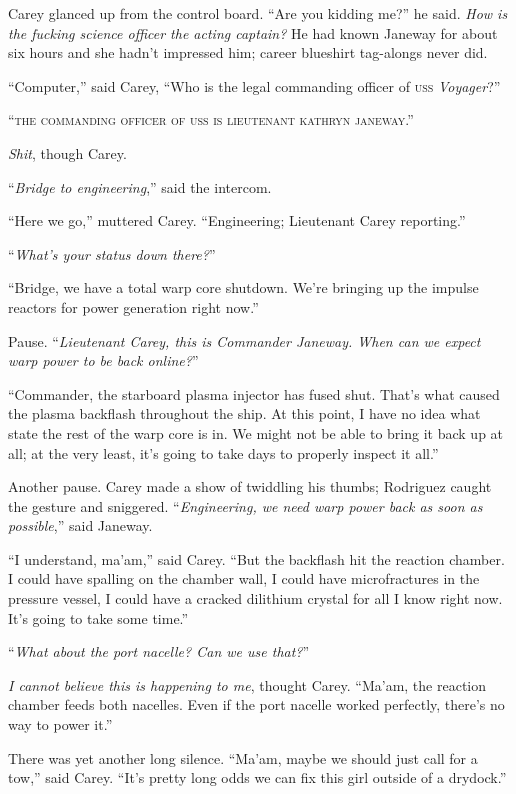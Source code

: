 \documentclass[twoside,letterpaper,12pt]{memoir}
\begin{document}
Carey glanced up from the control board. ``Are you kidding me?'' he said. \textit{How is the fucking science officer the acting captain?} He had known Janeway for about six hours and she hadn't impressed him; career blueshirt tag-alongs never did.

``Computer,'' said Carey, ``Who is the legal commanding officer of \textsc{uss} \textit{Voyager}?''

``\textsc{the commanding officer of uss}  \textsc{is lieutenant kathryn janeway}.''

\textit{Shit}, though Carey.

``\textit{Bridge to engineering},'' said the intercom.

``Here we go,'' muttered Carey. ``Engineering; Lieutenant Carey reporting.''

``\textit{What's your status down there?}''

``Bridge, we have a total warp core shutdown. We're bringing up the impulse reactors for power generation right now.''

Pause. ``\textit{Lieutenant Carey, this is Commander Janeway. When can we expect warp power to be back online?}''

``Commander, the starboard plasma injector has fused shut. That's what caused the plasma backflash throughout the ship. At this point, I have no idea what state the rest of the warp core is in. We might not be able to bring it back up at all; at the very least, it's going to take days to properly inspect it all.''

Another pause. Carey made a show of twiddling his thumbs; Rodriguez caught the gesture and sniggered. ``\textit{Engineering, we need warp power back as soon as possible},'' said Janeway.

``I understand, ma'am,'' said Carey. ``But the backflash hit the reaction chamber. I could have spalling on the chamber wall, I could have microfractures in the pressure vessel, I could have a cracked dilithium crystal for all I know right now. It's going to take some time.''

``\textit{What about the port nacelle? Can we use that?}''

\textit{I cannot believe this is happening to me}, thought Carey. ``Ma'am, the reaction chamber feeds both nacelles. Even if the port nacelle worked perfectly, there's no way to power it.''

There was yet another long silence. ``Ma'am, maybe we should just call for a tow,'' said Carey. ``It's pretty long odds we can fix this girl outside of a drydock.''
\end{document}
